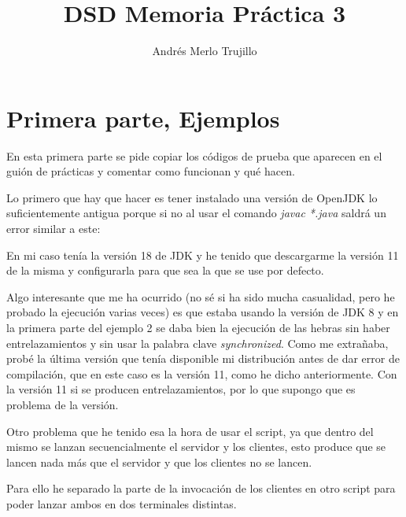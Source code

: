 \documentclass{article}
\title{DSD Memoria Práctica 3}
\author{Andrés Merlo Trujillo}
\date{}
\begin{document}
\maketitle

\section{Primera parte, Ejemplos}
En esta primera parte se pide copiar los códigos de prueba que aparecen en el guión de prácticas y comentar como funcionan y qué hacen.

\bigskip

Lo primero que hay que hacer es tener instalado una versión de OpenJDK lo suficientemente antigua porque si no al usar el comando \textit{javac *.java} saldrá un error similar a este:


En mi caso tenía la versión 18 de JDK y he tenido que descargarme la versión 11 de la misma y configurarla para que sea la que se use por defecto.

\bigskip

Algo interesante que me ha ocurrido (no sé si ha sido mucha casualidad, pero he probado la ejecución varias veces) es que estaba usando la versión de JDK 8 y en la primera parte del ejemplo 2 se daba bien la ejecución de las hebras sin haber entrelazamientos y sin usar la palabra clave \textit{synchronized}. Como me extrañaba, probé la última versión que tenía disponible mi distribución antes de dar error de compilación, que en este caso es la versión 11, como he dicho anteriormente. Con la versión 11 si se producen entrelazamientos, por lo que supongo que es problema de la versión.

\bigskip
Otro problema que he tenido esa la hora de usar el script, ya que dentro del mismo se lanzan secuencialmente el servidor y los clientes, esto produce que se lancen nada más que el servidor y que los clientes no se lancen.

Para ello he separado la parte de la invocación de los clientes en otro script para poder lanzar ambos en dos terminales distintas.
\end{document}

